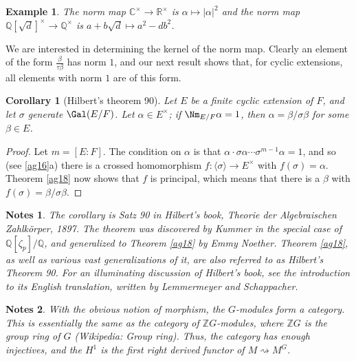 \documentclass[a4paper,11pt,final,openany]{memoir}
\newtheorem{corollary}[X]{Corollary}
\newtheorem{example}[X]{Example}
\newtheorem*{nt}{Notes}
\theoremstyle{nonumberplain}
\newtheorem{proof}{Proof.}
\begin{document}
\begin{example}
\label{ag18a}The norm map $\mathbb{C}^{\times}\rightarrow\mathbb{R}^{\times}$
is $\alpha\mapsto|\alpha|^{2}$ and the norm map $\mathbb{Q}[\sqrt{d}]^{\times
}\rightarrow\mathbb{Q}^{\times}$ is $a+b\sqrt{d}\mapsto a^{2}-db^{2}$.
\end{example}

We are interested in determining the kernel of the norm map. Clearly an
element of the form $\frac{\beta}{\tau\beta}$ has norm $1$, and our next
result shows that, for cyclic extensions, all elements with norm $1$ are of
this form.

\begin{corollary}
[Hilbert's theorem 90]\label{ag19}Let $E$ be a finite cyclic extension of $F$,
and let $\sigma$ generate $\Gal(E/F)$. Let $\alpha\in E^{\times}$; if
$\Nm_{E/F}\alpha=1$, then $\alpha=\beta/\sigma\beta$ for some $\beta\in E$.
\end{corollary}

\begin{proof}
Let $m=[E\colon F]$. The condition on $\alpha$ is that $\alpha\cdot
\sigma\alpha\cdots\sigma^{m-1}\alpha=1$, and so (see \ref{ag16}a) there is a
crossed homomorphism $f\colon\langle\sigma\rangle\rightarrow E^{\times}$ with
$f(\sigma)=\alpha$. Theorem \ref{ag18} now shows that $f$ is principal, which
means that there is a $\beta$ with $f(\sigma)=\beta/\sigma\beta.$
\end{proof}

\begin{nt}
The corollary is Satz 90 in Hilbert's book, Theorie der Algebraischen
Zahlk\"{o}rper, 1897. The theorem was discovered by Kummer in the special case
of $\mathbb{Q}{}[\zeta_{p}]/\mathbb{Q}{}$, and generalized to Theorem
\ref{ag18} by Emmy Noether. Theorem \ref{ag18}, as well as various vast
generalizations of it, are also referred to as Hilbert's Theorem 90. For an
illuminating discussion of Hilbert's book, see the introduction to its English
translation, written by Lemmermeyer and Schappacher.
\end{nt}

\begin{nt}
With the obvious notion of morphism, the $G$-modules form a category. This is
essentially the same as the category of $\mathbb{Z}G$-modules, where
$\mathbb{Z}G$ is the group ring of $G$ (Wikipedia: Group ring). Thus, the
category has enough injectives, and the $H^{1}$ is the first right derived
functor of $M\rightsquigarrow M^{G}$.
\end{nt}
\end{document}
